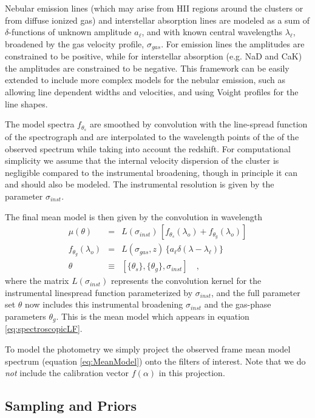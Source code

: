 \documentclass[iop,numberedappendix]{emulateapj}
\begin{document}
Nebular emission lines (which may arise from HII regions around the
clusters or from diffuse ionized gas) and interstellar absorption
lines are modeled as a sum of $\delta$-functions of unknown amplitude
$a_\ell$, and with known central wavelengths $\lambda_\ell$, broadened
by the gas velocity profile, $\sigma_{gas}$.  For emission lines the
amplitudes are constrained to be positive, while for interstellar
absorption (e.g. NaD and CaK) the amplitudes are constrained to be
negative. This framework can be easily extended to include more
complex models for the nebular emission, such as allowing line
dependent widths and velocities, and using Voight profiles for the
line shapes.

The model spectra $f_{\theta_s}$ are smoothed by convolution with
the line-spread function of the spectrograph and are interpolated to
the wavelength points of the of the observed spectrum while taking
into account the redshift. For computational simplicity we assume that
the internal velocity dispersion of the cluster is negligible compared
to the instrumental broadening, though in principle it can and should
also be modeled. The instrumental resolution is given by the parameter
$\sigma_{inst}$. 

The final mean model is then given by the convolution in wavelength
\begin{eqnarray}\label{eq:MeanModel} 
\mu(\theta) &  = & L(\sigma_{inst}) \, \left[ f_{\theta_s}(\lambda_o)
                   + f_{\theta_g}(\lambda_o) \right]\\
f_{\theta_g}(\lambda_o) & = & L(\sigma_{gas}, z) \,  \{a_\ell\delta(\lambda-\lambda_\ell)\}\\
\theta & \equiv & \left[ \{\theta_s\}, \{\theta_{g}\}, \sigma_{inst} \right]
\quad ,
\end{eqnarray}
where the matrix $L(\sigma_{inst})$ represents the convolution kernel
for the instrumental linespread function parameterized by
$\sigma_{inst}$,
and the full parameter set $\theta$ now includes
this instrumental broadening $\sigma_{inst}$ 
and the gas-phase parameters $\theta_g$.
This is the mean model which appears in equation
\ref{eq:spectroscopicLF}.

To model the photometry we simply project the observed frame mean
model spectrum (equation \ref{eq:MeanModel}) onto the filters of
interest.  Note that we do \emph{not} include the calibration vector
$f(\alpha)$ in this projection.


\subsection{Sampling and Priors}
\end{document}
